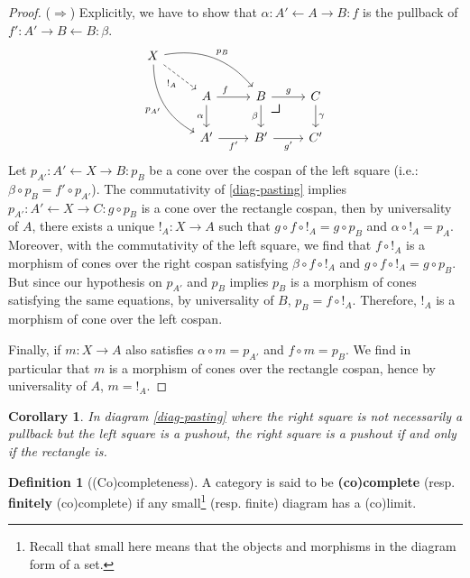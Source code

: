 \documentclass{article}
\newtheorem{cor}[thm]{Corollary}
\theoremstyle{definition}
\newtheorem{defn}[thm]{Definition}
\theoremstyle{remark}
\newcommand{\pullback}{\mbox{\LARGE$\lrcorner$}}
\begin{document}
\begin{proof}
    ($\Rightarrow$) Explicitly, we have to show that $\alpha: A' \leftarrow A \rightarrow B: f$ is the pullback of $f': A' \rightarrow B \leftarrow B: \beta$. 
    \begin{equation}
    \begin{tikzcd}
X \arrow[rdd, "p_{A'}"', bend right] \arrow[rd, "!_A"', dashed] \arrow[rrd, "p_B", bend left] &                     &                                            &            \\
                                               & A \arrow[r, "f", near start] \arrow[d, "\alpha"'] & B \arrow[r, "g"] \arrow[d, "\beta"'] \arrow[rd, "\pullback", phantom, very near start] & C \arrow[d, "\gamma"] \\
                                               & A' \arrow[r, "f'"']                & B' \arrow[r, "g'"']                                  & C'          
\end{tikzcd}
    \end{equation}
    Let $p_{A'} : A' \leftarrow X \rightarrow B: p_B$ be a cone over the cospan of the left square (i.e.: $\beta \circ p_B = f' \circ p_{A'}$). The commutativity of \eqref{diag-pasting} implies $p_{A'}: A' \leftarrow X \rightarrow C: g \circ p_B$ is a cone over the rectangle cospan, then by universality of $A$, there exists a unique $!_A: X \rightarrow A$ such that $g \circ f \circ !_A =  g \circ p_B$ and $\alpha \circ !_A = p_A$. Moreover, with the commutativity of the left square, we find that $f \circ !_A$ is a morphism of cones over the right cospan satisfying $\beta \circ f \circ !_A$ and $g \circ f \circ !_A = g \circ p_B$. But since our hypothesis on $p_{A'}$ and $p_B$ implies $p_B$ is a morphism of cones satisfying the same equations, by universality of $B$, $p_B = f \circ !_A$. Therefore, $!_A$ is a morphism of cone over the left cospan.
    
    Finally, if $m: X \rightarrow A$ also satisfies $\alpha \circ m = p_{A'}$ and $f \circ m = p_B$. We find in particular that $m$ is a morphism of cones over the rectangle cospan, hence by universality of $A$, $m = !_A$.
\end{proof}


\begin{cor}
    In diagram \eqref{diag-pasting} where the right square is not necessarily a pullback but the left square is a pushout, the right square is a pushout if and only if the rectangle is.
\end{cor}

\begin{defn}[(Co)completeness]
    A category is said to be \textbf{(co)complete} (resp. \textbf{finitely} (co)complete) if any small\footnote{Recall that small here means that the objects and morphisms in the diagram form of a set.} (resp. finite) diagram has a (co)limit.
\end{defn}
\end{document}
